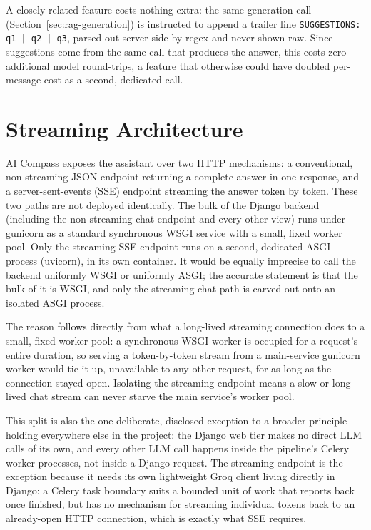 A closely related feature costs nothing extra: the same generation call (Section~\ref{sec:rag-generation}) is instructed to append a trailer line \texttt{SUGGESTIONS: q1 | q2 | q3}, parsed out server-side by regex and never shown raw. Since suggestions come from the same call that produces the answer, this costs zero additional model round-trips, a feature that otherwise could have doubled per-message cost as a second, dedicated call.

\section{Streaming Architecture}
\label{sec:rag-streaming}

AI Compass exposes the assistant over two HTTP mechanisms: a conventional, non-streaming JSON endpoint returning a complete answer in one response, and a server-sent-events (SSE) endpoint streaming the answer token by token. These two paths are not deployed identically. The bulk of the Django backend (including the non-streaming chat endpoint and every other view) runs under gunicorn as a standard synchronous WSGI service with a small, fixed worker pool. Only the streaming SSE endpoint runs on a second, dedicated ASGI process (uvicorn), in its own container. It would be equally imprecise to call the backend uniformly WSGI or uniformly ASGI; the accurate statement is that the bulk of it is WSGI, and only the streaming chat path is carved out onto an isolated ASGI process.

The reason follows directly from what a long-lived streaming connection does to a small, fixed worker pool: a synchronous WSGI worker is occupied for a request's entire duration, so serving a token-by-token stream from a main-service gunicorn worker would tie it up, unavailable to any other request, for as long as the connection stayed open. Isolating the streaming endpoint means a slow or long-lived chat stream can never starve the main service's worker pool.

This split is also the one deliberate, disclosed exception to a broader principle holding everywhere else in the project: the Django web tier makes no direct LLM calls of its own, and every other LLM call happens inside the pipeline's Celery worker processes, not inside a Django request. The streaming endpoint is the exception because it needs its own lightweight Groq client living directly in Django: a Celery task boundary suits a bounded unit of work that reports back once finished, but has no mechanism for streaming individual tokens back to an already-open HTTP connection, which is exactly what SSE requires.

